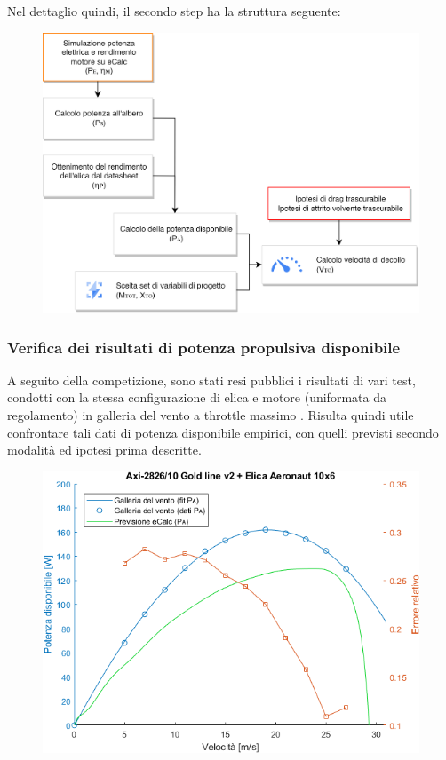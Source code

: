 \documentclass[12pt]{article}
\begin{document}
\noindent
Nel dettaglio quindi, il secondo step ha la struttura seguente:
\begin{figure}[h]
	\centering
	\includegraphics[width=11.6cm]{img/dim-vto-v2}
\end{figure}

\subsubsection{Verifica dei risultati di potenza propulsiva disponibile}
A seguito della competizione, sono stati resi pubblici i risultati di vari test, condotti con la stessa configurazione di elica e motore (uniformata da regolamento) in galleria del vento a throttle massimo \cite{windtunnel}. Risulta quindi utile confrontare tali dati di potenza disponibile empirici, con quelli previsti secondo modalità ed ipotesi prima descritte.

\begin{figure}[h]
	\centering
	\includegraphics[width=13cm]{img/plot-PA-crop}
\end{figure}
\end{document}
